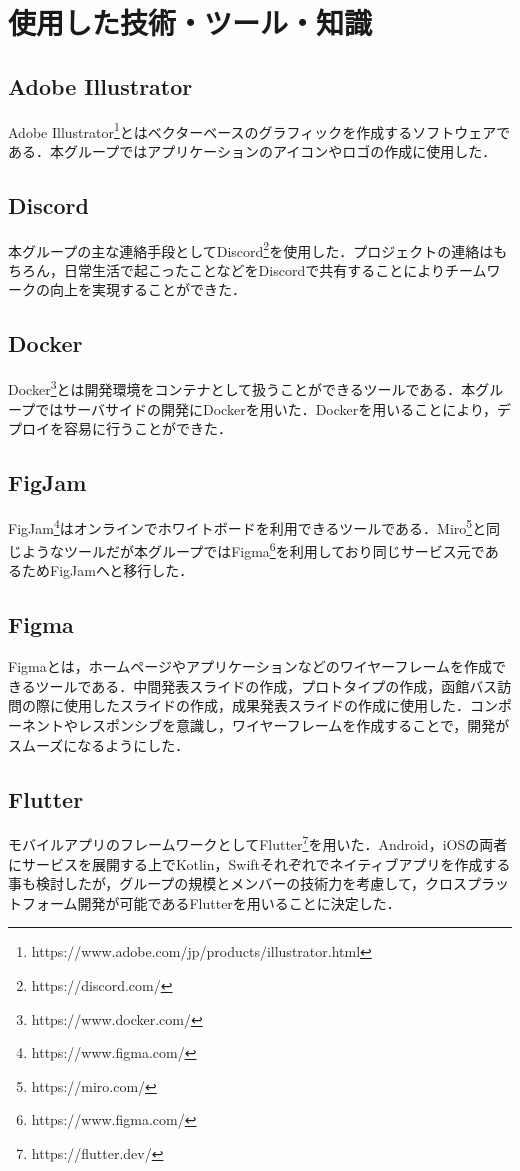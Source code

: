 \chapter{使用した技術・ツール・知識}

\section{Adobe Illustrator}
Adobe Illustrator\footnote{https://www.adobe.com/jp/products/illustrator.html}とはベクターベースのグラフィックを作成するソフトウェアである．本グループではアプリケーションのアイコンやロゴの作成に使用した．

\section{Discord}
本グループの主な連絡手段としてDiscord\footnote{https://discord.com/}を使用した．プロジェクトの連絡はもちろん，日常生活で起こったことなどをDiscordで共有することによりチームワークの向上を実現することができた．

\section{Docker}
Docker\footnote{https://www.docker.com/}とは開発環境をコンテナとして扱うことができるツールである．本グループではサーバサイドの開発にDockerを用いた．Dockerを用いることにより，デプロイを容易に行うことができた．

\section{FigJam}
FigJam\footnote{https://www.figma.com/}はオンラインでホワイトボードを利用できるツールである．Miro\footnote{https://miro.com/}と同じようなツールだが本グループではFigma\footnote{https://www.figma.com/}を利用しており同じサービス元であるためFigJamへと移行した．

\section{Figma}
Figmaとは，ホームページやアプリケーションなどのワイヤーフレームを作成できるツールである．中間発表スライドの作成，プロトタイプの作成，函館バス訪問の際に使用したスライドの作成，成果発表スライドの作成に使用した．コンポーネントやレスポンシブを意識し，ワイヤーフレームを作成することで，開発がスムーズになるようにした．

\pagebreak
\section{Flutter}
モバイルアプリのフレームワークとしてFlutter\footnote{https://flutter.dev/}を用いた．Android，iOSの両者にサービスを展開する上でKotlin，Swiftそれぞれでネイティブアプリを作成する事も検討したが，グループの規模とメンバーの技術力を考慮して，クロスプラットフォーム開発が可能であるFlutterを用いることに決定した．

